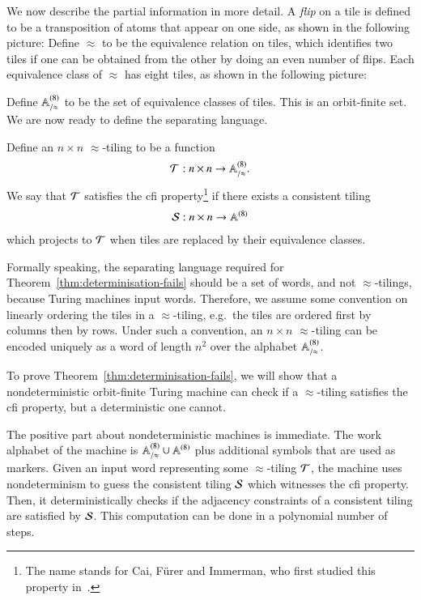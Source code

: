 We now describe the partial information in more detail.
A \emph{flip} on a tile is defined to be a transposition of atoms that appear on one side, as shown in the following picture:
Define $\approx$ to be the equivalence relation on tiles, which identifies two tiles if one can be obtained from the other by doing an even number of flips. Each equivalence class of $\approx$ has eight tiles, as shown in the following picture: 
 
\newcommand{\cfi}{{\sc cfi}\xspace}
 
Define $\mathbb A^{(8)}_{/\approx}$ to be the set of equivalence classes of tiles. This is an orbit-finite set. We are now ready to define the separating language. 

\begin{definition}[\cfi property]\label{def:cfi}
Define an $n\times n$ $\approx$-tiling to be a function
\begin{align*}
 {\mathcal T} : n \times n \to \mathbb A^{(8)}_{/\approx}.
\end{align*}
We say that ${\mathcal T}$ satisfies the \cfi property\footnote{The name stands for Cai, F\"urer and Immerman, who first studied this property in~\cite{DBLP:journals/combinatorica/CaiFI92}.} if there exists a consistent tiling
\begin{align*}
 {\mathcal S} : n \times n \to \mathbb A^{(8)}
\end{align*}
which projects to ${\mathcal T}$ when tiles are replaced by their equivalence classes.
\end{definition}

Formally speaking, the separating language required for Theorem~\ref{thm:determinisation-fails} should be a set of words, and not $\approx$-tilings, because Turing machines input words. Therefore, we assume some convention on linearly ordering the tiles in a $\approx$-tiling, e.g.~the tiles are ordered first by columns then by rows. Under such a convention, an $n\times n$ $\approx$-tiling can be encoded uniquely as a word of length $n^2$ over the alphabet $\mathbb A^{(8)}_{/\approx}$. 

To prove Theorem~\ref{thm:determinisation-fails}, we will show that a nondeterministic orbit-finite Turing machine can check if a $\approx$-tiling satisfies the \cfi property, but a deterministic one cannot.

The positive part about nondeterministic machines is immediate. The work alphabet of the machine is $\mathbb A^{(8)}_{/\approx} \cup \mathbb A^{(8)}$ plus additional symbols that are used as markers. Given an input word representing some $\approx$-tiling ${\mathcal T}$, the machine uses nondeterminism to guess the consistent tiling ${\mathcal S}$ which witnesses the \cfi property. Then, it deterministically checks if the adjacency constraints of a consistent tiling are satisfied by ${\mathcal S}$. This computation can be done in a polynomial number of steps.

